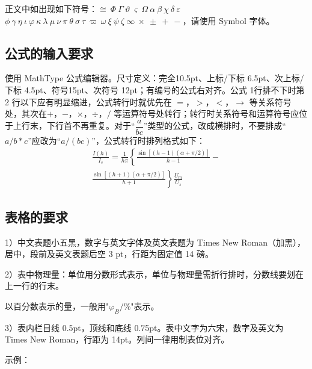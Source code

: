 \documentclass[UTF8,twoside,a4paper,fontset=none]{ctexart}
\begin{document}
正文中如出现如下符号：$\cong\ \Phi\ \Gamma\ \vartheta\ \varsigma\ \Omega\ \alpha\ \beta\ \chi\ \delta\ \varepsilon$ $\phi\ \gamma\ \eta\ \iota\ \varphi\ \kappa\ \lambda\ \mu\ \nu\ \pi\ \theta\ \sigma\ \tau\ \varpi\ \omega\ \xi\ \psi\ \zeta\ \infty\ \times\ \pm\ +\ -$，请使用 Symbol 字体。

\subsection{公式的输入要求}
使用 MathType 公式编辑器。尺寸定义：完全10.5pt、上标/下标 6.5pt、次上标/下标 4.5pt、符号15pt、次符号 12pt；有编号的公式右对齐。公式 1行排不下时第 2 行以下应有明显缩进，公式转行时就优先在 $=$，$>$，$<$，$\rightarrow$ 等关系符号处，其次在\linebreak $+$，$-$，$\times$，$\div$，$/$ 等运算符号处转行；转行时关系符号和运算符号应位于上行末，下行首不再重复。\linebreak 对于“$\dfrac{a}{bc}$”类型的公式，改成横排时，不要排成“$a/b*c$”应改为“$a/(bc)$”，公式转行时排列格式如下：
\begin{equation}
\label{eq:1}
\begin{aligned}
\frac{I(h)}{I_{s}} = \frac{1}{h \pi} \left\{\frac{\sin [(h - 1)(\alpha + \pi / 2)]}{h - 1} - \right. \\
\left. \frac{\sin [(h + 1)(\alpha + \pi / 2)]}{h + 1} \right\} \frac{U_{m}}{U_{s}}
\end{aligned}
\end{equation}

\vspace{16.15pt}
\subsection{表格的要求}
1）中文表题小五黑，数字与英文字体及英文表题为 Times New Roman（加黑），居中，段前及英文表题后空 3 pt，行距为固定值 14 磅。

2）表中物理量：单位用分数形式表示，单位与物理量需折行排时，分数线要划在上一行的行末。

以百分数表示的量，一般用"$\varphi_{B}/\%$"表示。

3）表内栏目线 0.5pt，顶线和底线 0.75pt。表中文字为六宋，数字及英文为 Times New Roman，行距为 14pt。列间一律用制表位对齐。

\vspace{16.15pt}
示例：
\end{document}
